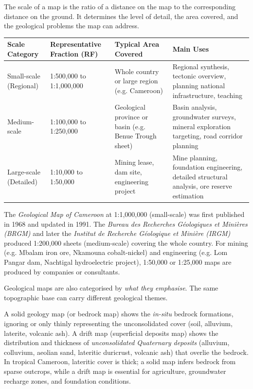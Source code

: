 \documentclass[11pt]{article}
\newcommand{\cle}[1]{{\popxbold\color{popdark}#1}}
\newcounter{popsec}
\newcounter{popsub}
\newcommand{\courssub}[1]{%
  \stepcounter{popsub}%
  \par\vspace{9pt}\noindent{\popxbold\fontsize{11.5}{13}\selectfont\color{popink}{\color{poporange}\thepopsec.\thepopsub}\hspace{6pt}#1}\par\nopagebreak\vspace{4pt}
}
\begin{document}
The \cle{scale} of a map is the ratio of a distance on the map to the corresponding distance on the ground. It determines the level of detail, the area covered, and the geological problems the map can address.

\begin{center}
\begin{tabularx}{\linewidth}{|l|X|X|X|}
\hline
\rowcolor{popblueL}
\textbf{Scale Category} & \textbf{Representative Fraction (RF)} & \textbf{Typical Area Covered} & \textbf{Main Uses} \\
\hline
\cle{Small-scale} (Regional) & 1:500,000 to 1:1,000,000 & Whole country or large region (e.g. Cameroon) & Regional synthesis, tectonic overview, planning national infrastructure, teaching \\
\hline
\cle{Medium-scale} & 1:100,000 to 1:250,000 & Geological province or basin (e.g. Benue Trough sheet) & Basin analysis, groundwater surveys, mineral exploration targeting, road corridor planning \\
\hline
\cle{Large-scale} (Detailed) & 1:10,000 to 1:50,000 & Mining lease, dam site, engineering project & Mine planning, foundation engineering, detailed structural analysis, ore reserve estimation \\
\hline
\end{tabularx}
\end{center}

\begin{savaistu}
The \emph{Geological Map of Cameroon} at 1:1,000,000 (small-scale) was first published in 1968 and updated in 1991. The \emph{Bureau des Recherches Géologiques et Minières (BRGM)} and later the \emph{Institut de Recherche Géologique et Minière (IRGM)} produced 1:200,000 sheets (medium-scale) covering the whole country. For mining (e.g. Mbalam iron ore, Nkamouna cobalt-nickel) and engineering (e.g. Lom Pangar dam, Nachtigal hydroelectric project), 1:50,000 or 1:25,000 maps are produced by companies or consultants.
\end{savaistu}

\courssub{Classification by Purpose}

Geological maps are also categorised by \emph{what they emphasise}. The same topographic base can carry different geological themes.

\begin{definition}
A \cle{solid geology map} (or bedrock map) shows the \emph{in-situ} bedrock formations, ignoring or only thinly representing the unconsolidated cover (soil, alluvium, laterite, volcanic ash). A \cle{drift map} (superficial deposits map) shows the distribution and thickness of \emph{unconsolidated Quaternary deposits} (alluvium, colluvium, aeolian sand, lateritic duricrust, volcanic ash) that overlie the bedrock. In tropical Cameroon, lateritic cover is thick; a solid map infers bedrock from sparse outcrops, while a drift map is essential for agriculture, groundwater recharge zones, and foundation conditions.
\end{definition}
\end{document}
